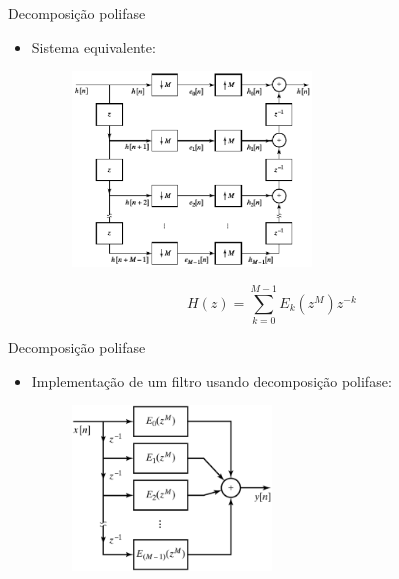 \begin{slide}{Decomposição polifase}
	\begin{itemize}
		\item Sistema equivalente:
			\begin{figure}
				\centering
				\includegraphics[width=0.6\textwidth]{figs/4-36.eps}
			\end{figure}
			\begin{equation*}
				H(z)= \sum_{k=0}^{M-1} E_k(z^M)z^{-k}
			\end{equation*}
	\end{itemize}
\end{slide}

\begin{slide}{Decomposição polifase}
	\begin{itemize}
		\item Implementação de um filtro usando decomposição polifase:
			\begin{figure}
				\centering
				\includegraphics[width=0.5\textwidth]{figs/4-37.eps}
			\end{figure}
	\end{itemize}
\end{slide}

